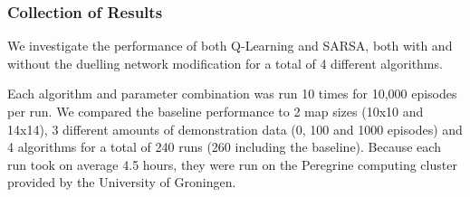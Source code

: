 \subsubsection{Collection of Results}\label{sec:datacollection}
We investigate the performance of both Q-Learning and SARSA, both with and without the duelling network modification for a total of 4 different algorithms.

Each algorithm and parameter combination was run 10 times for 10,000 episodes per run. We compared the baseline performance to 2 map sizes (10x10 and 14x14), 3 different amounts of demonstration data (0, 100 and 1000 episodes) and 4 algorithms for a total of 240 runs (260 including the baseline). Because each run took on average 4.5 hours, they were run on the Peregrine computing cluster provided by the University of Groningen.
